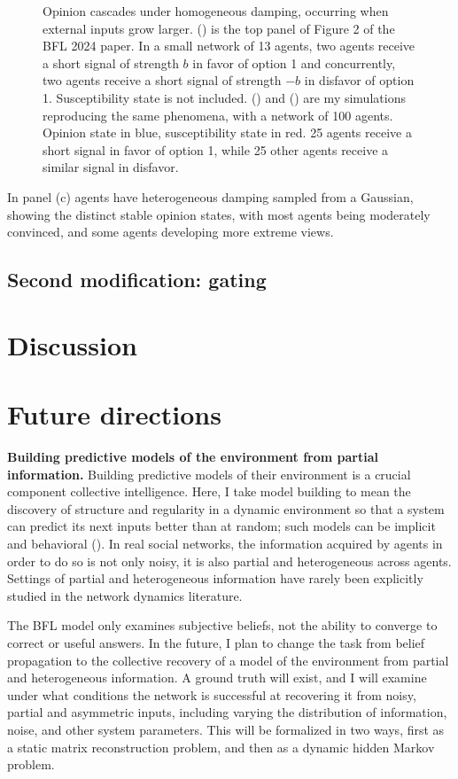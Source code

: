 \documentclass[]{article}
\begin{document}
\begin{figure}
	\caption{Opinion cascades under homogeneous damping, occurring when external inputs grow larger. () is the top panel of Figure 2 of the BFL 2024 paper. In a small network of 13 agents, two agents receive a short signal of strength $b$ in favor of option 1 and concurrently, two agents receive a short signal of strength $-b$ in disfavor of option 1. Susceptibility state is not included. () and () are my simulations reproducing the same phenomena, with a network of 100 agents. Opinion state in blue, susceptibility state in red. 25 agents receive a short signal in favor of option 1, while 25 other agents receive a similar signal in disfavor. }\label{fig:homdamping}
\end{figure}


In panel (c) agents have heterogeneous damping sampled from a Gaussian, showing the distinct stable opinion states, with most agents being moderately convinced, and some agents developing more extreme views. 

\subsection{Second modification: gating}

\section{Discussion}


\section{Future directions}

\textbf{Building predictive models of the environment from partial information.} Building predictive models of their environment is a crucial component collective intelligence. Here, I take model building to mean the discovery of structure and regularity in a dynamic environment so that a system can predict its next inputs better than at random; such models can be implicit and behavioral (\cite{crutchfieldCalculiEmergenceComputation1994}). In real social networks, the information acquired by agents in order to do so is not only noisy, it is also partial and heterogeneous across agents. Settings of partial and heterogeneous information have rarely been explicitly studied in the network dynamics literature.

The BFL model only examines subjective beliefs, not the ability to converge to correct or useful answers. In the future, I plan to change the task from belief propagation to the collective recovery of a model of the environment from partial and heterogeneous information. A ground truth will exist, and I will examine under what conditions the network is successful at recovering it from noisy, partial and asymmetric inputs, including varying the distribution of information, noise, and other system parameters. This will be formalized in two ways, first as a static matrix reconstruction problem, and then as a dynamic hidden Markov problem.
\end{document}
